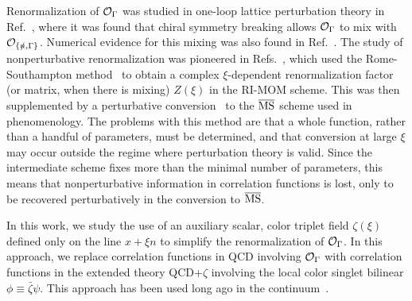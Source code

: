 Renormalization of $\mathcal{O}_\Gamma$ was studied in one-loop lattice
perturbation theory in Ref.~\cite{Constantinou:2017sej}, where it was
found that chiral symmetry breaking allows $\mathcal{O}_\Gamma$ to mix with
$\mathcal{O}_{\{\slashed{n},\Gamma\}}$. Numerical evidence for this mixing was
also found in Ref.~\cite{Yoon:2017qzo}.
The study of nonperturbative renormalization was pioneered in
Refs.~\cite{Alexandrou:2017huk,Chen:2017mzz}, which used the
Rome-Southampton method~\cite{Martinelli:1994ty} to obtain a complex
$\xi$-dependent renormalization factor (or matrix, when there is
mixing) $Z(\xi)$ in the RI-MOM scheme. This was then supplemented by a
perturbative conversion~\cite{Constantinou:2017sej}
to the $\overline{\text{MS}}$ scheme used in
phenomenology. The problems with this method are that a whole
function, rather than a handful of parameters, must be determined, and
that conversion at large $\xi$ may occur outside the regime where
perturbation theory is valid. Since the intermediate scheme fixes more
than the minimal number of parameters, this means that nonperturbative
information in correlation functions is lost, only to be recovered
perturbatively in the conversion to $\overline{\text{MS}}$.

In this work, we study the use of an auxiliary scalar, color triplet
field $\zeta(\xi)$ defined only on the line $x+\xi n$ to simplify the
renormalization of $\mathcal{O}_\Gamma$. In this approach, we replace
correlation functions in QCD involving $\mathcal{O}_\Gamma$ with correlation
functions in the extended theory QCD+$\zeta$ involving the local color
singlet bilinear $\phi\equiv \bar\zeta\psi$. This approach has been
used long ago in the continuum~\cite{Craigie:1980qs,Dorn:1986dt}.

